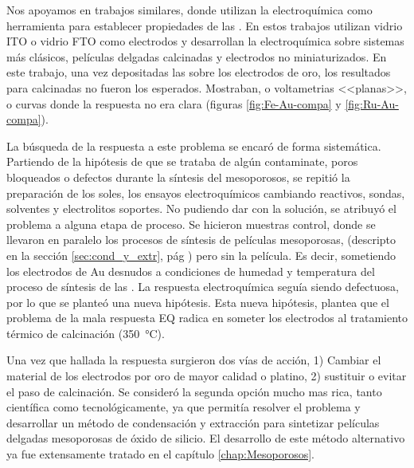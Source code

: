 {  			Nos apoyamos en trabajos similares\cite{Otal2006,Calvo2009b,Fattakhova-Rohlfing2007,Rohlfing2005}, donde utilizan la electroquímica como herramienta para establecer propiedades de las \pdm. En estos trabajos utilizan vidrio ITO o vidrio FTO como electrodos y desarrollan la electroquímica sobre sistemas más clásicos, películas delgadas calcinadas y electrodos no miniaturizados. En este trabajo, una vez depositadas las \pdm\space sobre los electrodos de oro, los resultados para \pdm\space calcinadas no fueron los esperados.  Mostraban, o voltametrias <<planas>>, o curvas donde la respuesta no era clara (figuras \ref{fig:Fe-Au-compa} y \ref{fig:Ru-Au-compa}). 

  			La búsqueda de la respuesta a este problema se encaró de forma sistemática. Partiendo de la hipótesis de que se trataba de algún contaminate, poros bloqueados o defectos durante la síntesis del mesoporosos, se repitió la preparación de los soles, los ensayos electroquímicos cambiando reactivos, sondas, solventes y electrolitos soportes. No pudiendo dar con la solución, se atribuyó el problema a alguna etapa de proceso. Se hicieron muestras control, donde se llevaron en paralelo los procesos de síntesis de películas mesoporosas, (descripto en la sección \ref{sec:cond_y_extr}, pág \pageref{sec:cond_y_extr}) pero sin la película. Es decir, sometiendo los electrodos de Au desnudos a condiciones de humedad y temperatura del proceso de síntesis de las \pdm. La respuesta electroquímica seguía siendo defectuosa, por lo que se planteó una nueva hipótesis. Esta nueva hipótesis, plantea que el problema de la mala respuesta EQ radica en someter los electrodos al tratamiento térmico de calcinación (\SI{350}{\celsius}).

  			Una vez que hallada la respuesta surgieron dos vías de acción, 1) Cambiar el material de los electrodos por oro de mayor calidad o platino, 2) sustituir o evitar el paso de calcinación. Se consideró la segunda opción mucho mas rica, tanto científica como tecnológicamente, ya que permitía resolver el problema y desarrollar un método de condensación y extracción para sintetizar películas delgadas mesoporosas de óxido de silicio. El desarrollo de este método alternativo ya fue extensamente tratado en el capítulo \ref{chap:Mesoporosos}.

}
